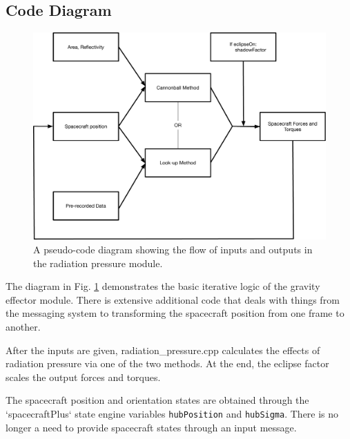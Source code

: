 \subsection{Code Diagram}

\begin{figure}[H]
	\centering \includegraphics[height=0.6\textwidth, keepaspectratio]{Figures/codeFlow.pdf}
	\caption{A pseudo-code diagram showing the flow of inputs and outputs in the radiation pressure module.}
	\label{img:codeFlow}
\end{figure}

The diagram in Fig. \ref{img:codeFlow} demonstrates the basic iterative logic of the gravity effector module. There is extensive additional code that deals with things from the messaging system to transforming the spacecraft position from one frame to another.

After the inputs are given, radiation\_pressure.cpp calculates the effects of radiation pressure via one of the two methods. At the end, the eclipse factor scales the output forces and torques.

The spacecraft position and orientation states are obtained through the `spacecraftPlus` state engine variables {\tt hubPosition} and {\tt hubSigma}. There is no longer a need to provide spacecraft states through an input message.